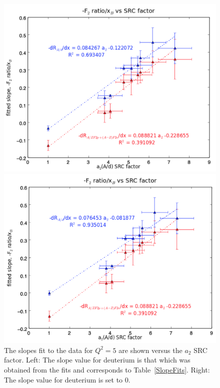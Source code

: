 \documentclass[oneside]{article}
\begin{document}
\begin{figure}[H]
\begin{minipage}{0.5\textwidth}
      	  \includegraphics[width=\textwidth]{plots/a2SRC.png}
      	  \end{minipage}\hfill\begin{minipage}{0.5\textwidth}
      	        	  \includegraphics[width=\textwidth]{plots/a2SRCfixed.png}
\end{minipage}
 	 \caption[]{The slopes fit to the data for $Q^2=5$ are shown versus the $a_2$ SRC factor. Left: The slope value for deuterium is that which was obtained from the fits and corresponds to Table~\ref{SlopeFits}. Right: The slope value for deuterium is set to 0.}
  \label{fig:a2_src}
 \end{figure}
 
\end{document}
